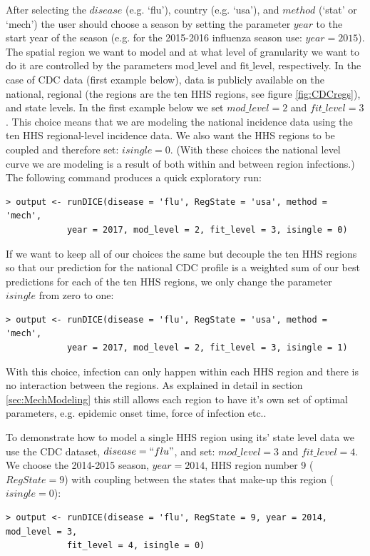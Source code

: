 \documentclass[a4paper]{article}
\begin{document}
After selecting the $disease$ (e.g. `flu'), country (e.g. `usa'), and  $method$ (`stat' or `mech') the user should choose  a season by setting the parameter $year$ to the start year of the season (e.g. for the 2015-2016 influenza season use: $year=2015$). The spatial region we want to model and at what level of granularity we want to do it are controlled by the parameters mod$\_$level and fit$\_$level, respectively. In the case of CDC data (first example below), data is publicly available on the national, regional (the regions are the ten HHS regions, see figure  \ref{fig:CDCregs}), and state levels.  In the first example below we set $mod\_level = 2$ and $fit\_level = 3$.  This choice means that we are modeling the national incidence data using the ten HHS regional-level incidence data.  We also want the HHS regions to be coupled and therefore set: $isingle=0$.  (With these choices the national level curve we are modeling is a result of both within and between region infections.)
The following command produces a quick exploratory  run:

\begin{verbatim}
> output <- runDICE(disease = 'flu', RegState = 'usa', method = 'mech',
            year = 2017, mod_level = 2, fit_level = 3, isingle = 0)
\end{verbatim}


If we want to keep all of our choices the same but decouple the ten HHS regions so that our prediction for the national CDC profile is a weighted sum of our best predictions for each of the ten HHS regions, we only change the parameter $isingle$ from zero to one:


\begin{verbatim}
> output <- runDICE(disease = 'flu', RegState = 'usa', method = 'mech',
            year = 2017, mod_level = 2, fit_level = 3, isingle = 1)
\end{verbatim}
With this choice, infection can only happen within each HHS region and there is no interaction between the regions. As explained in detail in section \ref{sec:MechModeling} this still allows each region to have it's  own set of optimal parameters, e.g. epidemic onset time, force of infection etc..

To demonstrate how to model a single HHS region using its' state level data we use the CDC dataset, $disease = ``flu"$, and set: $mod\_level=3$ and $fit\_level=4$.  We choose the 2014-2015 season, $year=2014$, HHS region number 9 ($RegState = 9$) with coupling between the states that make-up this region ($isingle=0$):
\begin{verbatim}
> output <- runDICE(disease = 'flu', RegState = 9, year = 2014, mod_level = 3,
            fit_level = 4, isingle = 0)
\end{verbatim}
\end{document}
